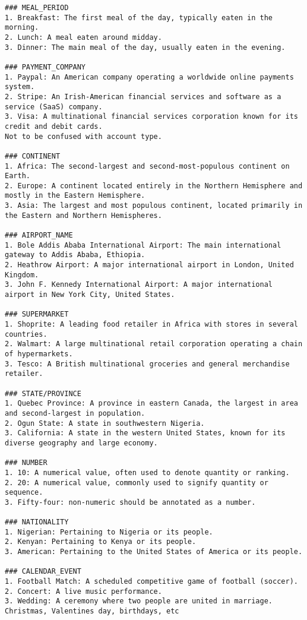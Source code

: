 \begin{verbatim}
### MEAL_PERIOD
1. Breakfast: The first meal of the day, typically eaten in the morning.
2. Lunch: A meal eaten around midday.
3. Dinner: The main meal of the day, usually eaten in the evening.

### PAYMENT_COMPANY
1. Paypal: An American company operating a worldwide online payments system.
2. Stripe: An Irish-American financial services and software as a service (SaaS) company.
3. Visa: A multinational financial services corporation known for its credit and debit cards.
Not to be confused with account type.

### CONTINENT
1. Africa: The second-largest and second-most-populous continent on Earth.
2. Europe: A continent located entirely in the Northern Hemisphere and mostly in the Eastern Hemisphere.
3. Asia: The largest and most populous continent, located primarily in the Eastern and Northern Hemispheres.

### AIRPORT_NAME
1. Bole Addis Ababa International Airport: The main international gateway to Addis Ababa, Ethiopia.
2. Heathrow Airport: A major international airport in London, United Kingdom.
3. John F. Kennedy International Airport: A major international airport in New York City, United States.

### SUPERMARKET
1. Shoprite: A leading food retailer in Africa with stores in several countries.
2. Walmart: A large multinational retail corporation operating a chain of hypermarkets.
3. Tesco: A British multinational groceries and general merchandise retailer.

### STATE/PROVINCE
1. Quebec Province: A province in eastern Canada, the largest in area and second-largest in population.
2. Ogun State: A state in southwestern Nigeria.
3. California: A state in the western United States, known for its diverse geography and large economy.

### NUMBER
1. 10: A numerical value, often used to denote quantity or ranking.
2. 20: A numerical value, commonly used to signify quantity or sequence.
3. Fifty-four: non-numeric should be annotated as a number.

### NATIONALITY
1. Nigerian: Pertaining to Nigeria or its people.
2. Kenyan: Pertaining to Kenya or its people.
3. American: Pertaining to the United States of America or its people.

### CALENDAR_EVENT
1. Football Match: A scheduled competitive game of football (soccer).
2. Concert: A live music performance.
3. Wedding: A ceremony where two people are united in marriage.
Christmas, Valentines day, birthdays, etc


\end{verbatim}

